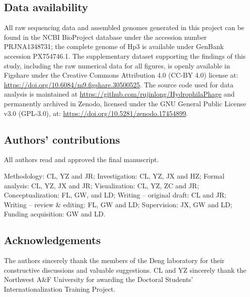 \subsection{Data availability}\label{data-availability}

All raw sequencing data and assembled genomes generated in this project
can be found in the NCBI BioProject database under the accession number
PRJNA1348731; the complete genome of Hp3 is available under GenBank
accession PX754746.1. The supplementary dataset supporting the findings of this
study, including the raw numerical data for all figures, is openly
available in Figshare under the Creative Commons Attribution 4.0 (CC-BY
4.0) license at: \url{https://doi.org/10.6084/m9.figshare.30500525}. The
source code used for data analysis is maintained at
\url{https://github.com/rujinlong/HydrophilaPhage} and permanently
archived in Zenodo, licensed under the GNU General Public License v3.0
(GPL-3.0), at: \url{https://doi.org/10.5281/zenodo.17454899}.

\subsection{Authors' contributions}\label{authors-contributions}

All authors read and approved the final manuscript.

Methodology: CL, YZ and JR; Investigation: CL, YZ, JX and HZ; Formal
analysis: CL, YZ, JX and JR; Visualization: CL, YZ, ZC and JR;
Conceptualization: FL, GW, and LD; Writing -- original draft: CL and JR;
Writing -- review \& editing: FL, GW and LD; Supervision: JX, GW and LD;
Funding acquisition: GW and LD.

\subsection{Acknowledgements}\label{acknowledgements}

The authors sincerely thank the members of the Deng laboratory for their
constructive discussions and valuable suggestions. CL and YZ sincerely
thank the Northwest A\&F University for awarding the Doctoral Students'
Internationalization Training Project.


\renewcommand\refname{Reference}
